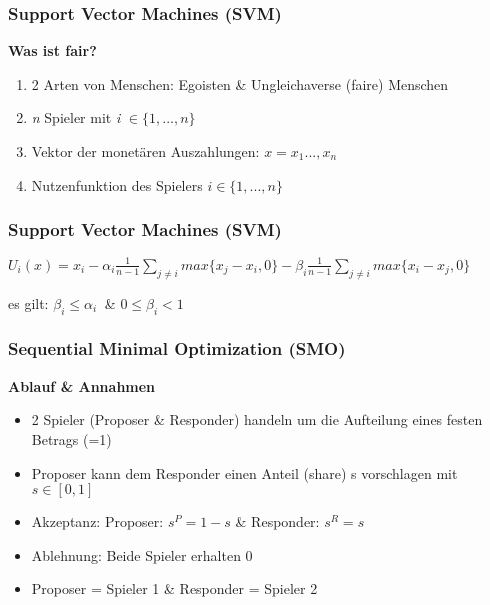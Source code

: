 \documentclass[10pt, compress]{beamer}
\begin{document}
\begin{frame}[fragile]
\frametitle{Support Vector Machines (SVM)}

\begin{center}
\textbf{Was ist fair?}
\end{center}

 \begin{enumerate}
        \item 2 Arten von Menschen: Egoisten \& Ungleichaverse (faire) Menschen
        \item \emph{n} Spieler mit \emph{i}     \(\in \lbrace 1,...,n \rbrace\)
        \item Vektor der monetären Auszahlungen:  \(x=x_1...,x_n\)       
        \item Nutzenfunktion des Spielers \(i \in \lbrace 1,...,n \rbrace\) 
       
       \end{enumerate}
\end{frame}


\begin{frame}[fragile]
\frametitle{Support Vector Machines (SVM)}

\begin{large}
\begin{center} \(U_i(x) = x_i - \alpha_i \frac{1}{n-1} \sum\limits_{j\neq i}max \lbrace x_j - x_i, 0\rbrace - \beta_i \frac{1}{n-1} \sum\limits_{j\neq i} max \lbrace x_i - x_j, 0 \rbrace\)\end{center}    
\end{large}

\begin{center} es gilt: \(\beta_i \leq \alpha_i\ \)  \&  \( 0\leq\beta_i<1\) \end{center}

\end{frame}


\begin{frame}[fragile]
\frametitle{Sequential Minimal Optimization (SMO)}

\textbf{Ablauf \& Annahmen}
   \begin{itemize}
        \item 2 Spieler (Proposer \& Responder) handeln um die Aufteilung eines festen Betrags (=1) \item Proposer kann dem Responder einen Anteil (share) s vorschlagen mit \(s \in [0,1]\) \item Akzeptanz: Proposer: \(s^P=1-s\) \&  Responder: \(s^R=s\) \item Ablehnung: Beide Spieler erhalten 0 \item Proposer = Spieler 1 \& Responder = Spieler 2
      \end{itemize}



\end{frame}
\end{document}

